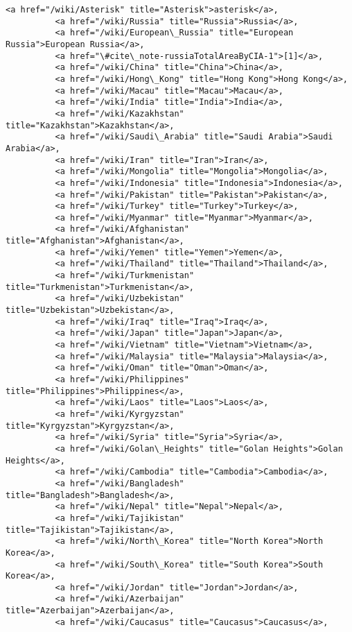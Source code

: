 \documentclass[11pt]{article}
\begin{document}
\begin{Verbatim}[commandchars=\\\{\}]
          <a href="/wiki/Asterisk" title="Asterisk">asterisk</a>,
          <a href="/wiki/Russia" title="Russia">Russia</a>,
          <a href="/wiki/European\_Russia" title="European Russia">European Russia</a>,
          <a href="\#cite\_note-russiaTotalAreaByCIA-1">[1]</a>,
          <a href="/wiki/China" title="China">China</a>,
          <a href="/wiki/Hong\_Kong" title="Hong Kong">Hong Kong</a>,
          <a href="/wiki/Macau" title="Macau">Macau</a>,
          <a href="/wiki/India" title="India">India</a>,
          <a href="/wiki/Kazakhstan" title="Kazakhstan">Kazakhstan</a>,
          <a href="/wiki/Saudi\_Arabia" title="Saudi Arabia">Saudi Arabia</a>,
          <a href="/wiki/Iran" title="Iran">Iran</a>,
          <a href="/wiki/Mongolia" title="Mongolia">Mongolia</a>,
          <a href="/wiki/Indonesia" title="Indonesia">Indonesia</a>,
          <a href="/wiki/Pakistan" title="Pakistan">Pakistan</a>,
          <a href="/wiki/Turkey" title="Turkey">Turkey</a>,
          <a href="/wiki/Myanmar" title="Myanmar">Myanmar</a>,
          <a href="/wiki/Afghanistan" title="Afghanistan">Afghanistan</a>,
          <a href="/wiki/Yemen" title="Yemen">Yemen</a>,
          <a href="/wiki/Thailand" title="Thailand">Thailand</a>,
          <a href="/wiki/Turkmenistan" title="Turkmenistan">Turkmenistan</a>,
          <a href="/wiki/Uzbekistan" title="Uzbekistan">Uzbekistan</a>,
          <a href="/wiki/Iraq" title="Iraq">Iraq</a>,
          <a href="/wiki/Japan" title="Japan">Japan</a>,
          <a href="/wiki/Vietnam" title="Vietnam">Vietnam</a>,
          <a href="/wiki/Malaysia" title="Malaysia">Malaysia</a>,
          <a href="/wiki/Oman" title="Oman">Oman</a>,
          <a href="/wiki/Philippines" title="Philippines">Philippines</a>,
          <a href="/wiki/Laos" title="Laos">Laos</a>,
          <a href="/wiki/Kyrgyzstan" title="Kyrgyzstan">Kyrgyzstan</a>,
          <a href="/wiki/Syria" title="Syria">Syria</a>,
          <a href="/wiki/Golan\_Heights" title="Golan Heights">Golan Heights</a>,
          <a href="/wiki/Cambodia" title="Cambodia">Cambodia</a>,
          <a href="/wiki/Bangladesh" title="Bangladesh">Bangladesh</a>,
          <a href="/wiki/Nepal" title="Nepal">Nepal</a>,
          <a href="/wiki/Tajikistan" title="Tajikistan">Tajikistan</a>,
          <a href="/wiki/North\_Korea" title="North Korea">North Korea</a>,
          <a href="/wiki/South\_Korea" title="South Korea">South Korea</a>,
          <a href="/wiki/Jordan" title="Jordan">Jordan</a>,
          <a href="/wiki/Azerbaijan" title="Azerbaijan">Azerbaijan</a>,
          <a href="/wiki/Caucasus" title="Caucasus">Caucasus</a>,

\end{Verbatim}
\end{document}
